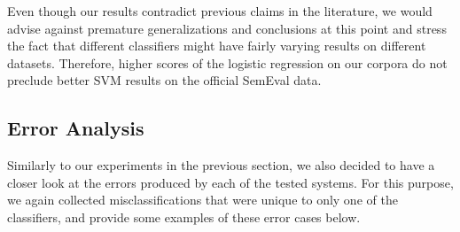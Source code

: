 Even though our results contradict previous claims in the literature,
we would advise against premature generalizations and conclusions at
this point and stress the fact that different classifiers might have
fairly varying results on different datasets.  Therefore, higher
scores of the logistic regression on our corpora do not preclude
better SVM results on the official SemEval data.

\subsection{Error Analysis}\label{subsec:cgsa:ml-methods:err-analysis}

Similarly to our experiments in the previous section, we also decided
to have a closer look at the errors produced by each of the tested
systems.  For this purpose, we again collected misclassifications that
were unique to only one of the classifiers, and provide some examples
of these error cases below.

